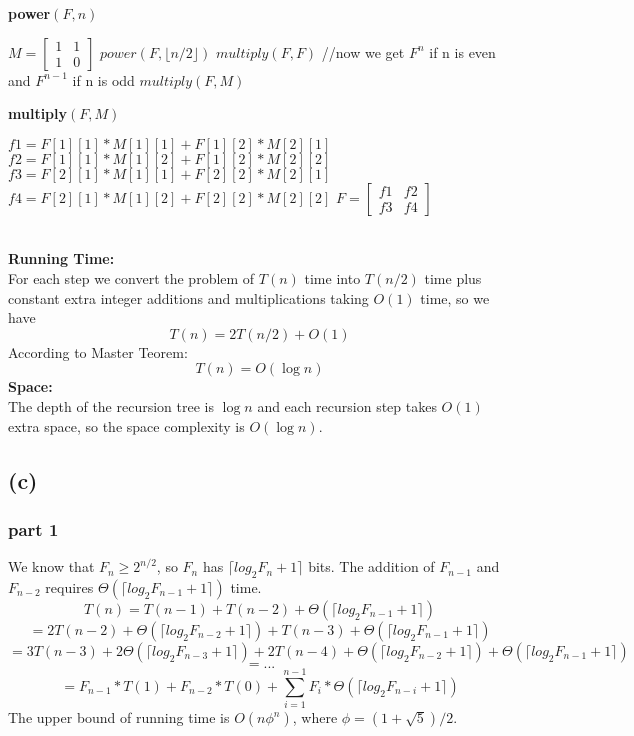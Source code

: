 \documentclass[twoside]{homework}
\begin{document}
\begin{algorithm}
	\caption*{\textbf{power}$(F,n)$}
	\begin{algorithmic}
		\RETURN
		\ENDIF
		\STATE $M=\begin{bmatrix}
		1&1\\
		1&0
		\end{bmatrix}$
		\STATE $power(F, \lfloor n/2 \rfloor)$
		\STATE $multiply(F, F)$ //now we get $F^n$ if n is even and $F^{n-1}$ if n is odd
		\STATE $multiply(F,M)$
		\ENDIF
	\end{algorithmic}		
\end{algorithm}
\begin{algorithm}
	\caption*{\textbf{multiply$(F,M)$}}
	\begin{algorithmic}
		\STATE $f1=F[1][1]*M[1][1]+F[1][2]*M[2][1]$
		\STATE $f2=F[1][1]*M[1][2]+F[1][2]*M[2][2]$
		\STATE $f3=F[2][1]*M[1][1]+F[2][2]*M[2][1]$
		\STATE $f4=F[2][1]*M[1][2]+F[2][2]*M[2][2]$
		\STATE $F=\begin{bmatrix}
		f1&f2\\
		f3&f4
		\end{bmatrix}$	
	\end{algorithmic}		
\end{algorithm}
\\\textbf{Running Time:} \quad
\\For each step we convert the problem of $T(n)$ time into $T(n/2)$ time plus constant extra integer additions and multiplications taking $O(1)$ time, so we have
$$T(n)=2T(n/2)+O(1)$$
According to Master Teorem:
$$T(n)=O (\log n)$$
\textbf{Space:} \quad
\\The depth of the recursion tree is $\log n$ and each recursion step takes $O(1)$ extra space, so the space complexity is $O(\log n)$.
\subsection*{(c)}
\subsubsection*{part 1} 
We know that $F_n\ge 2^{n/2}$, so $F_n$ has $\lceil log_2F_n+1\rceil$ bits. The addition of $F_{n-1}$ and $F_{n-2}$ requires $\Theta(\lceil log_2F_{n-1}+1\rceil)$ time.
\\$$T(n) = T(n-1)+T(n-2)+\Theta(\lceil log_2F_{n-1}+1\rceil)$$
$$=2T(n-2)+\Theta(\lceil log_2F_{n-2}+1\rceil)+T(n-3)+\Theta(\lceil log_2F_{n-1}+1\rceil)$$
$$=3T(n-3)+2\Theta(\lceil log_2F_{n-3}+1\rceil)+2T(n-4)+\Theta(\lceil log_2F_{n-2}+1\rceil)+\Theta(\lceil log_2F_{n-1}+1\rceil)$$
$$=...$$
$$=F_{n-1}*T(1)+F_{n-2}*T(0)+\sum_{i=1}^{n-1}F_{i}*\Theta(\lceil log_2F_{n-i}+1\rceil)$$
The upper bound of running time is $O(n\phi^n)$, where $\phi=(1+\sqrt{5})/2$.
\end{document}
